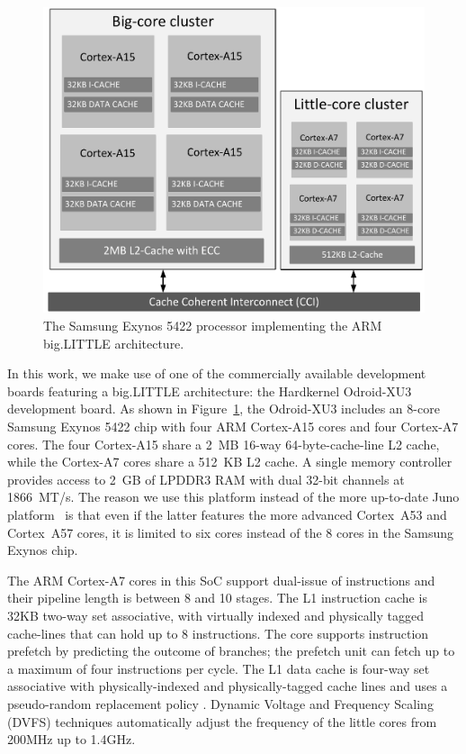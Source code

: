 \begin{figure}[t]
        \centering
        \includegraphics[width=\columnwidth]{figures/block_diagram.pdf}%
        \caption{The Samsung Exynos 5422 processor implementing the ARM big.LITTLE architecture.}%
        \label{fig:big-little-diagram}%
        \vspace{-0.4cm}
\end{figure}

In this work, we make use of one of the commercially available development boards featuring a big.LITTLE architecture: the Hardkernel Odroid-XU3 development board. As shown in Figure~\ref{fig:big-little-diagram}, the Odroid-XU3 includes an 8-core Samsung Exynos 5422 chip with four ARM Cortex-A15 cores and four Cortex-A7 cores. The four Cortex-A15 share a 2~MB 16-way 64-byte-cache-line L2 cache, while the Cortex-A7 cores share a 512~KB L2 cache. A single memory controller provides access to 2~GB of LPDDR3 RAM with dual 32-bit channels at 1866~MT/s. The reason we use this platform instead of the more up-to-date Juno platform~\cite{Juno} is that even if the latter features the more advanced Cortex~A53 and Cortex~A57 cores, it is limited to six cores instead of the 8 cores in the Samsung Exynos chip.


The ARM Cortex-A7 cores in this SoC support dual-issue of instructions and their pipeline length is between 8 and 10 stages. The L1 instruction cache is 32KB two-way set associative, with virtually indexed and physically tagged cache-lines that can hold up to 8 instructions. The core supports instruction prefetch by predicting the outcome of branches; the prefetch unit can fetch up to a maximum of four instructions per cycle. The L1 data cache is four-way set associative with physically-indexed and physically-tagged cache lines and uses a pseudo-random replacement policy \cite{TRM_A7}. Dynamic Voltage and Frequency Scaling (DVFS) techniques automatically adjust the frequency of the little cores from 200MHz up to 1.4GHz.

